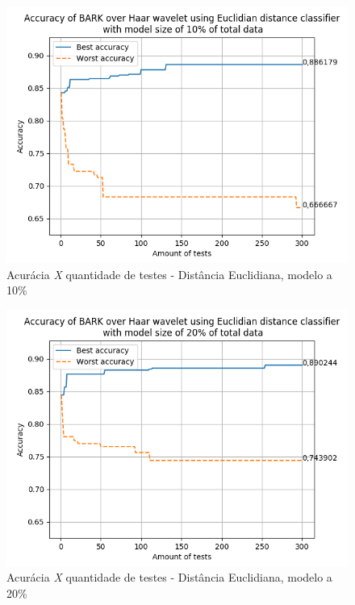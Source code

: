 \begin{myenv}{1.5}
			\newpage
			\begin{figure}[h]
				\centering
				\includegraphics{images/results/confusionMatrices/classifier_Euclidian_10}
				\caption{Acurácia \textit{X} quantidade de testes - Distância Euclidiana, modelo a 10\%}
				\label{fig:classifiereuclidian10}
			\end{figure}
			
			\newpage
			\begin{figure}[h]
				\centering
				\includegraphics{images/results/confusionMatrices/classifier_Euclidian_20}
				\caption{Acurácia \textit{X} quantidade de testes - Distância Euclidiana, modelo a 20\%}
				\label{fig:classifiereuclidian20}
			\end{figure}
			
	

\end{myenv}
